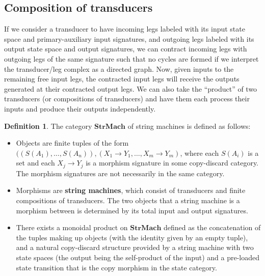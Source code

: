 \documentclass{article}
\theoremstyle{definition}
\newtheorem{definition}{Definition}[section]
\theoremstyle{remark}
\begin{document}
\subsection{Composition of transducers}
If we consider a transducer to have incoming legs labeled with
its input state space and primary-auxiliary input signatures, and
outgoing legs labeled with its output state space and output signatures,
we can contract incoming legs with outgoing legs of the same signature
such that no cycles are formed if we interpret the transducer/leg complex
as a directed graph.
Now, given inputs to the remaining free input legs, the contracted
input legs will receive the outputs generated at their contracted
output legs. We can also take the ``product'' of two transducers
(or compositions of transducers) and have them each process their
inputs and produce their outputs independently.
\begin{definition}
    \label{def:strmachinecategory} The
    category $\mathbf{StrMach}$
    of string machines is defined as follows:
    \begin{itemize}
        \item Objects are finite tuples of the form
        $((S(A_1),\dots,S(A_n)),(X_1\to Y_1,\dots,
        X_m\to Y_m)$, where each $S(A_i)$ is a set and
        each $X_j\to Y_j$ is a morphism signature in some
        copy-discard category. The morphism signatures are not
        necessarily in the same category.
        \item Morphisms are \textbf{string machines}, which
        consist of transducers and finite compositions of transducers.
        The two objects that a string machine is a morphism between
        is determined by its total input and output signatures.
        \item There exists a monoidal product on $\mathbf{StrMach}$
        defined as the concatenation of the tuples making up objects
        (with the identity given by an empty tuple),
        and a natural copy-discard structure provided by a
        string machine with two state spaces (the
        output being the self-product of the input)
        and a pre-loaded state transition that is the copy morphism
        in the state category.
    \end{itemize}
\end{definition}
\end{document}
